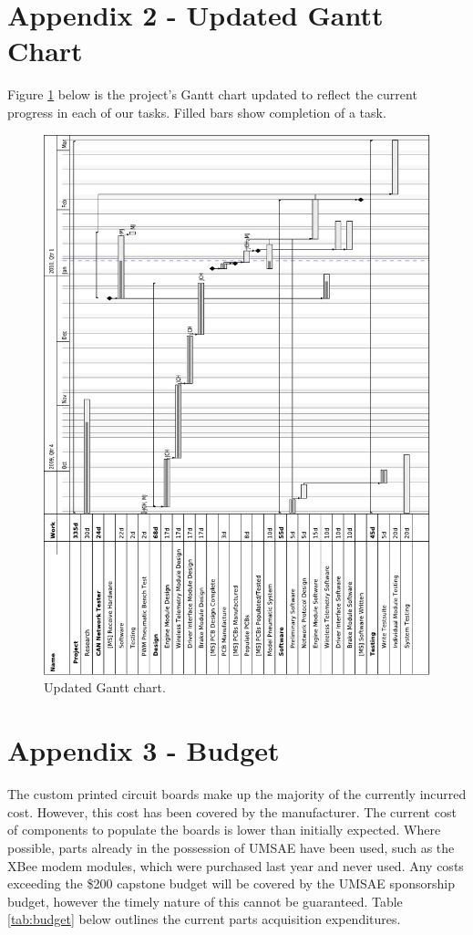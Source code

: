 \documentclass[12pt]{report}
\begin{document}
  \pagebreak

  \section*{Appendix 2 - Updated Gantt Chart}

  Figure \ref{fig:gantt} below is the project's Gantt chart updated to reflect the current progress in each of our tasks. Filled bars show completion of a task.

  \begin{figure}[H]
  \centering{}
    \includegraphics[width=0.75\columnwidth]{gantt_chart.pdf}

  
  \begin{flushleft}
  \caption{Updated Gantt chart.}
  \end{flushleft}

  \label{fig:gantt}
  \end{figure}

  \pagebreak

  \section*{Appendix 3 - Budget}

The custom printed circuit boards make up the majority of the currently incurred cost. However, this cost has been covered by the manufacturer. The current cost of components to populate the boards is lower than initially expected. Where possible, parts already in the possession of UMSAE have been used, such as the XBee modem modules, which were purchased last year and never used. Any costs exceeding the \$200 capstone budget will be covered by the UMSAE sponsorship budget, however the timely nature of this cannot be guaranteed. Table \ref{tab:budget} below outlines the current parts acquisition expenditures.
\end{document}
